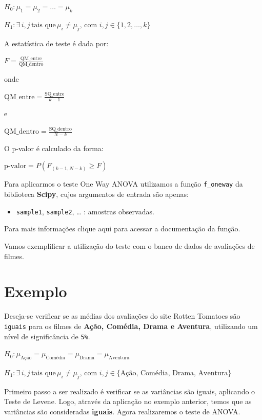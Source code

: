 \documentclass[
  letterpaper,
  DIV=11,
  numbers=noendperiod]{scrreprt}
\providecommand{\tightlist}{%
  \setlength{\itemsep}{0pt}\setlength{\parskip}{0pt}}\usepackage{longtable,booktabs,array}
\begin{document}
\(H_0: \mu_1 = \mu_2 = \dots = \mu_k\)

\(H_1: \exists \, i, j \, \text{tais que} \, \mu_i \neq \mu_j, \, \text{com } i, j \in \{1, 2, \dots, k\}\)

A estatística de teste é dada por:

\(F = \frac{\text{QM\_entre}}{\text{QM\_dentro}}\)

onde

\(\text{QM\_entre} = \frac{\text{SQ\_entre}}{k - 1}\)

e

\(\text{QM\_dentro} = \frac{\text{SQ\_dentro}}{N - k}\)

O p-valor é calculado da forma:

\(\text{p-valor} = P(F_{(k-1, N-k)} \geq F)\)

Para aplicarmos o teste One Way ANOVA utilizamos a função
\texttt{f\_oneway} da biblioteca \textbf{Scipy}, cujos argumentos de
entrada são apenas:

\begin{itemize}
\tightlist
\item
  \texttt{sample1}, \texttt{sample2}, \ldots{} : amostras observadas.
\end{itemize}

Para mais informações clique aqui para acessar a documentação da função.

Vamos exemplificar a utilização do teste com o banco de dados de
avaliações de filmes.

\hypertarget{exemplo-5}{%
\section{Exemplo}\label{exemplo-5}}

Deseja-se verificar se as médias dos avaliações do site Rotten Tomatoes
são \texttt{iguais} para os filmes de \textbf{Ação, Comédia, Drama e
Aventura}, utilizando um nível de significância de \texttt{5\%}.

\(H_0: \mu_{\text{Ação}} = \mu_{\text{Comédia}} = \mu_{\text{Drama}} = \mu_{\text{Aventura}}\)

\(H_1: \exists \, i, j \, \text{tais que} \, \mu_i \neq \mu_j, \, \text{com } i, j \in \{\text{Ação, Comédia, Drama, Aventura}\}\)

Primeiro passo a ser realizado é verificar se as variâncias são iguais,
aplicando o Teste de Levene. Logo, através da aplicação no exemplo
anterior, temos que as variâncias são consideradas \textbf{iguais}.
Agora realizaremos o teste de ANOVA.
\end{document}
